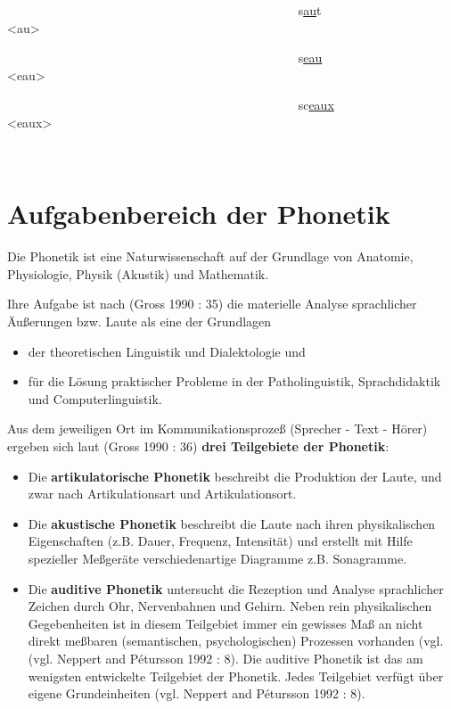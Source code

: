\documentclass[
  letterpaper,
]{scrbook}
\begin{document}
~~~~~~~~~~~~~~~~~~~~~~~~~~~~~~~~~~~~~~~~~~~~~~
s\uline{au}t~~~~~~~~~~~~~~~~ \textless au\textgreater{}

~~~~~~~~~~~~~~~~~~~~~~~~~~~~~~~~~~~~~~~~~~~~~~
s\uline{eau}~~~~~~~~~~~~~~~ \textless eau\textgreater{}

~~~~~~~~~~~~~~~~~~~~~~~~~~~~~~~~~~~~~~~~~~~~~~
sc\uline{eaux}~~~~~~~~~~~~ \textless eaux\textgreater{}

~

\hypertarget{sec-phonetik}{%
\chapter{Aufgabenbereich der Phonetik}\label{sec-phonetik}}

Die Phonetik ist eine Naturwissenschaft auf der Grundlage von Anatomie,
Physiologie, Physik (Akustik) und Mathematik.

Ihre Aufgabe ist nach (Gross 1990 : 35) die materielle Analyse
sprachlicher Äußerungen bzw. Laute als eine der Grundlagen

\begin{itemize}
\item
  der theoretischen Linguistik und Dialektologie und
\item
  für die Lösung praktischer Probleme in der Patholinguistik,
  Sprachdidaktik und Computerlinguistik.
\end{itemize}

Aus dem jeweiligen Ort im Kommunikationsprozeß (Sprecher - Text - Hörer)
ergeben sich laut (Gross 1990 : 36) \textbf{drei Teilgebiete der
Phonetik}:

\begin{itemize}
\item
  Die \textbf{artikulatorische Phonetik} beschreibt die Produktion der
  Laute, und zwar nach Artikulationsart und Artikulationsort.
\item
  Die \textbf{akustische Phonetik} beschreibt die Laute nach ihren
  physikalischen Eigenschaften (z.B. Dauer, Frequenz, Intensität) und
  erstellt mit Hilfe spezieller Meßgeräte verschiedenartige Diagramme
  z.B. Sonagramme.
\item
  Die \textbf{auditive Phonetik} untersucht die Rezeption und Analyse
  sprachlicher Zeichen durch Ohr, Nervenbahnen und Gehirn. Neben rein
  physikalischen Gegebenheiten ist in diesem Teilgebiet immer ein
  gewisses Maß an nicht direkt meßbaren (semantischen, psychologischen)
  Prozessen vorhanden (vgl. (vgl. Neppert and Pétursson 1992 : 8). Die
  auditive Phonetik ist das am wenigsten entwickelte Teilgebiet der
  Phonetik. Jedes Teilgebiet verfügt über eigene Grundeinheiten (vgl.
  Neppert and Pétursson 1992 : 8).
\end{itemize}
\end{document}
